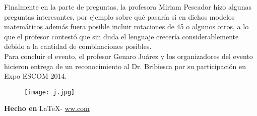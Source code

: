 \documentclass{article}
\begin{document}
{Finalmente en la parte de preguntas, la profesora Miriam Pescador hizo algunas preguntas interesantes, por ejemplo sobre qué pasaría si en dichos modelos matemáticos además fuera posible incluir rotaciones de 45 o algunos otros, a lo que el profesor contestó que sin duda el lenguaje crecería considerablemente debido a la cantidad de combinaciones posibles.
\\

Para concluir el evento, el profesor Genaro Juárez y los organizadores del evento hicieron entrega de un reconocimiento al Dr. Bribiesca por su participación en Expo ESCOM 2014.
}

\begin{figure}[h]
\centering
\texttt{[image: j.jpg]}
\end{figure}

\large{\hfill \textbf{Hecho en } \LaTeX - \url{ww.com}}
\end{document}
